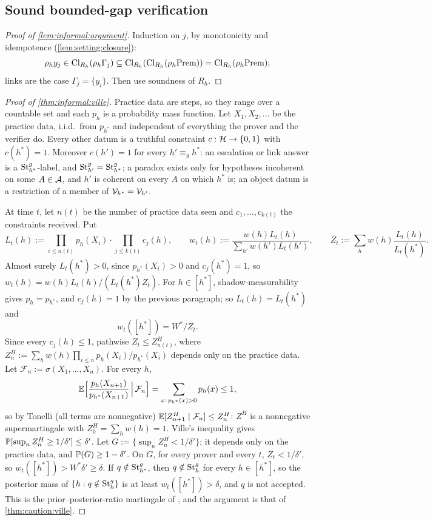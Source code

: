 \subsection{Sound bounded-gap verification}\label{app:informal:verify}

\begin{proof}[Proof of \cref{lem:informal:argument}]
Induction on $j$, by monotonicity and idempotence (\cref{lem:setting:closure}):
\[
\rho_hy_j\in\mathrm{Cl}_{R_h}(\rho_h\Gamma_j)\subseteq\mathrm{Cl}_{R_h}(\mathrm{Cl}_{R_h}(\rho_h\mathrm{Prem}))=\mathrm{Cl}_{R_h}(\rho_h\mathrm{Prem});
\]
links are the case $\Gamma_j=\{y_i\}$. Then use soundness of $R_h$.
\end{proof}

\begin{proof}[Proof of \cref{thm:informal:ville}]
Practice data are steps, so they range over a countable set and each $p_h$ is a probability mass function. Let $X_1,X_2,\dots$ be the practice data, i.i.d.\ from $p_{h^*}$ and independent of everything the prover and the verifier do. Every other datum is a truthful constraint $c:\mathcal{H}\to\{0,1\}$ with $c(h^*)=1$. Moreover $c(h')=1$ for every $h'\equiv_gh^*$: an escalation or link answer is a $\mathrm{St}^{g}_{h^*}$-label, and $\mathrm{St}^{g}_{h'}=\mathrm{St}^{g}_{h^*}$; a paradox exists only for hypotheses incoherent on some $A\in\mathcal{A}$, and $h'$ is coherent on every $A$ on which $h^*$ is; an object datum is a restriction of a member of $\mathcal V_{h^*}=\mathcal V_{h'}$.

At time $t$, let $n(t)$ be the number of practice data seen and $c_1,\dots,c_{k(t)}$ the constraints received. Put
\[
L_t(h):=\prod_{i\le n(t)}p_h(X_i)\cdot\prod_{j\le k(t)}c_j(h),\qquad
w_t(h):=\frac{w(h)L_t(h)}{\sum_{h'}w(h')L_t(h')},\qquad
Z_t:=\sum_hw(h)\frac{L_t(h)}{L_t(h^*)}.
\]
Almost surely $L_t(h^*)>0$, since $p_{h^*}(X_i)>0$ and $c_j(h^*)=1$, so $w_t(h)=w(h)L_t(h)/(L_t(h^*)Z_t)$. For $h\in[h^*]$, shadow-measurability gives $p_h=p_{h^*}$, and $c_j(h)=1$ by the previous paragraph; so $L_t(h)=L_t(h^*)$ and
\[
w_t([h^*])=W^*/Z_t.
\]
Since every $c_j(h)\le1$, pathwise $Z_t\le Z^H_{n(t)}$, where $Z^H_n:=\sum_hw(h)\prod_{i\le n}p_h(X_i)/p_{h^*}(X_i)$ depends only on the practice data. Let $\mathcal F_n:=\sigma(X_1,\dots,X_n)$. For every $h$,
\[
\mathbb{E}\Big[\frac{p_h(X_{n+1})}{p_{h^*}(X_{n+1})}\,\Big|\,\mathcal F_n\Big]=\sum_{x:\,p_{h^*}(x)>0}p_h(x)\le1,
\]
so by Tonelli (all terms are nonnegative) $\mathbb{E}[Z^H_{n+1}\mid\mathcal F_n]\le Z^H_n$: $Z^H$ is a nonnegative supermartingale with $Z^H_0=\sum_hw(h)=1$. Ville's inequality \citep{ville1939etude} gives $\mathbb{P}[\sup_nZ^H_n\ge1/\delta']\le\delta'$. Let $G:=\{\sup_nZ^H_n<1/\delta'\}$; it depends only on the practice data, and $\mathbb{P}(G)\ge1-\delta'$. On $G$, for every prover and every $t$, $Z_t<1/\delta'$, so $w_t([h^*])>W^*\delta'\ge\delta$. If $q\notin\mathrm{St}^{g}_{h^*}$, then $q\notin\mathrm{St}^{g}_{h}$ for every $h\in[h^*]$, so the posterior mass of $\{h:q\notin\mathrm{St}^{g}_{h}\}$ is at least $w_t([h^*])>\delta$, and $q$ is not accepted. This is the prior--posterior-ratio martingale of \citet{waudbysmith2020confidence}, and the argument is that of \cref{thm:caution:ville}.
\end{proof}

